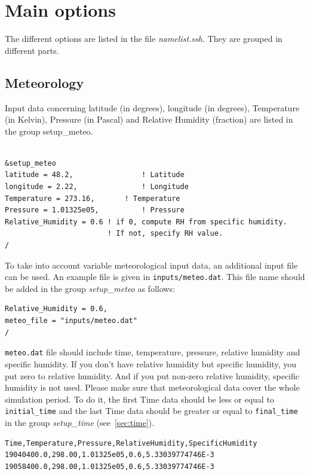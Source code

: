 \documentclass[a4paper,11pt]{article}
\newcommand{\code}[1]{\texttt{#1}}
\begin{document}
\section{Main options}

The different options are listed in the file {\textit{namelist.ssh}}. They are grouped in different parts.

\subsection{Meteorology}

Input data concerning latitude (in degrees), longitude (in degrees), Temperature (in Kelvin), Pressure (in Pascal) and Relative Humidity (fraction) are listed in the group setup\_meteo. 

\begin{verbatim}

&setup_meteo
latitude = 48.2,                ! Latitude
longitude = 2.22,               ! Longitude
Temperature = 273.16,    	! Temperature
Pressure = 1.01325e05,         	! Pressure
Relative_Humidity = 0.6	! if 0, compute RH from specific humidity. 
                        ! If not, specify RH value.
/

\end{verbatim}

To take into account variable meteorological input data, an additional input file can be used. An example file is given in \code{inputs/meteo.dat}. This file name should be added in the group {\textit{setup\_meteo}} as follows: 

\begin{verbatim}
Relative_Humidity = 0.6,
meteo_file = "inputs/meteo.dat"
/
\end{verbatim}

\code{meteo.dat} file should include time, temperature, pressure, relative humidity and specific humidity. 
If you don't have relative humidity but specific humidity, you put zero to relative humidity. And if you put non-zero relative humidity, specific humidity is not used. 
Please make sure that meteorological data cover the whole simulation period. To do it, the first Time data should be less or equal to \code{initial\_time} and the last Time data should be greater or equal to \code{final\_time} in the group  {\textit{setup\_time}} (see~\ref{sec:time}).


\begin{verbatim}
Time,Temperature,Pressure,RelativeHumidity,SpecificHumidity
19040400.0,298.00,1.01325e05,0.6,5.33039774746E-3    
19058400.0,298.00,1.01325e05,0.6,5.33039774746E-3
\end{verbatim}
\end{document}
